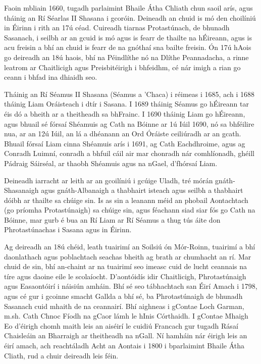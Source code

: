 \documentclass[a4paper,12pt]{article}
\theoremstyle{plain} %
\theoremstyle{definition} %
\theoremstyle{remark} %
\begin{document}
Faoin mbliain 1660, tugadh parlaimint Bhaile Átha Chliath chun saoil arís, agus tháinig an Rí Séarlas II Shasana i gcoróin. Deineadh an chuid is mó den choilíniú in Éirinn i rith an 17ú céad. Cuireadh tiarnas Protastúnach, de bhunadh Sasanach, i seilbh ar an gcuid is mó agus is fearr de thailte na hÉireann, agus is acu freisin a bhí an chuid is fearr de na gnóthaí sna bailte freisin. Ón 17ú hAois go deireadh an 18ú haois, bhí na Péindlíthe nó na Dlíthe Peannadacha, a rinne leatrom ar Chaitlicigh agus Preisbitéirigh i bhfeidhm, cé nár imigh a rian go ceann i bhfad ina dhiaidh seo.

Tháinig an Rí Séamus II Shasana (Séamus a 'Chaca) i réimeas i 1685, ach i 1688 tháinig Liam Oráisteach i dtír i Sasana. I 1689 tháinig Séamus go hÉireann tar éis dó a bheith ar a theitheadh sa bhFrainc. I 1690 tháinig Liam go hÉireann, agus bhuail sé fórsaí Shéamuis ag Cath na Bóinne ar 1ú Iúil 1690, nó sa bhféilire nua, ar an 12ú Iúil, an lá a dhéanann an Ord Óráiste ceiliúradh ar an gcath. Bhuail fórsaí Liam cinna Shéamuis arís i 1691, ag Cath Eachdhroime, agus ag Conradh Luimní, conradh a bhfuil cáil air mar chonradh nár comhlíonadh, ghéill Pádraig Sáirséal, ar thaobh Shéamuis agus na nGael, d'fhórsaí Liam.

Deineadh iarracht ar leith ar an gcoilíniú i gcúige Uladh, tré mórán gnáth-Shasanaigh agus gnáth-Albanaigh a thabhairt isteach agus seilbh a thabhairt dóibh ar thailte sa chúige sin. Is as sin a leanann méid an phobail Aontachtach (go príomha Protastúnaigh) sa chúige sin, agus féachann siad siar fós go Cath na Bóinne, mar gurb é bua an Rí Liam ar Rí Séamus a thug tús áite don Phrotastúnachas i Sasana agus in Éirinn.

Ag deireadh an 18ú chéid, leath tuairimí an Soilsiú ón Mór-Roinn, tuairimí a bhí daonlathach agus poblachtach seachas bheith ag brath ar chumhacht an rí. Mar chuid de sin, bhí an-chaint ar na tuairimí seo imeasc cuid de lucht ceannais na tíre agus daoine eile le scolaíocht. D'aontóidís idir Chaitlicigh, Phrotastúnaigh agus Easaontóirí i náisiún amháin. Bhí sé seo tábhachtach san Éirí Amach i 1798, agus cé gur i gcoinne smacht Gallda a bhí sé, ba Phrotastúnaigh de bhunadh Sasanach cuid mhaith de na ceannairí. Bhí aighneas i gContae Loch Garman, m.sh. Cath Chnoc Fíodh na gCaor lámh le hInis Córthaidh. I gContae Mhaigh Eo d'éirigh chomh maith leis an aiséirí le cuidiú Francach gur tugadh Rásaí Chaisleáin an Bharraigh ar theitheadh na nGall. Ní hamháin nár éirigh leis an éirí amach, ach reachtáladh Acht an Aontais i 1800 i bparlaimint Bhaile Átha Cliath, rud a chuir deireadh leis féin.
\end{document}
